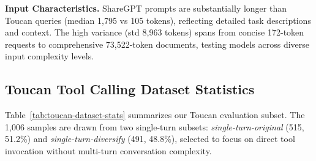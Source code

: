 \documentclass{article}
\theoremstyle{plain}
\theoremstyle{definition}
\begin{document}
\textbf{Input Characteristics.} ShareGPT prompts are substantially longer than Toucan queries (median 1,795 vs 105 tokens), reflecting detailed task descriptions and context. The high variance (std 8,963 tokens) spans from concise 172-token requests to comprehensive 73,522-token documents, testing models across diverse input complexity levels.

\subsection{Toucan Tool Calling Dataset Statistics}
\label{subsec:toucan-statistics}

Table~\ref{tab:toucan-dataset-stats} summarizes our Toucan evaluation subset. The 1,006 samples are drawn from two single-turn subsets: \textit{single-turn-original} (515, 51.2\%) and \textit{single-turn-diversify} (491, 48.8\%), selected to focus on direct tool invocation without multi-turn conversation complexity.
\end{document}
